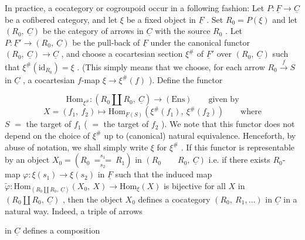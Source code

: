 In practice, a cocategory or cogroupoid occur in a following fashion: Let $P : \underline{F} \to \underline{C}$ be a cofibered category, and let $\xi$ be a fixed object in $\underline{F}$ . Set $R_0 = P(\xi)$ and let $(R_0,\ \underline{C})$ be the category of arrows in $\underline{C}$ with the source $R_0$ . Let $P : \underline{F}' \to (R_0,\ \underline{C})$ be the pull-back of $\underline{F}$ under the canonical functor $(R_0,\ \underline{C}) \to \underline{C}$ , and choose a cocartesian section $\xi^{\#}$ of $\underline{F}'$ over $(R_0,\ \underline{C})$ such that $\xi^{\#}(\mathrm{id}_{R_0}) = \xi$ . (This simply means that we choose, for each arrow $R_0 \xrightarrow{f} S$ in $\underline{C}$ , a cocartesian $f$-map $\xi \to \xi^{\#}(f)$ ). Define the functor

\begin{equation*}
\mathrm{Hom}_{\xi^{\#}} : (R_0 \amalg R_0,\ \underline{C}) \to (\mathrm{Ens}) \qquad \text{given by}
\end{equation*}
\begin{equation*}
X = (f_1,\ f_2) \longmapsto \mathrm{Hom}_{\underline{F}(S)}(\xi^{\#}(f_1),\ \xi^{\#}(f_2)) \qquad \text{where}
\end{equation*}
$S$ $=$ the target of $f_1$ ( $=$ the target of $f_2$ ). We note that this functor does not depend on the choice of $\xi^{\#}$ up to (canonical) natural equivalence. Henceforth, by abuse of notation, we shall simply write $\xi$ for $\xi^{\#}$ . If this functor is representable by an object $X_0 = (R_0 \ \overset{s_1}{\underset{s_2}{=\!=}}\ R_1)$ in $(R_0 \qquad R_0,\ \underline{C})$ i.e. if there exists $R_0$-map $\varphi : \xi(s_1) \to \xi(s_2)$ in $\underline{F}$ such that the induced map $\widetilde{\varphi} : \mathrm{Hom}_{(R_0 \amalg R_0,\ \underline{C})}(X_0,\ X) \to \mathrm{Hom}_{\xi}(X)$ is bijective for all $X$ in $(R_0 \amalg R_0,\ \underline{C})$ , then the object $X_0$ defines a cocategory $(R_0,\ R_1,\ldots)$ in $\underline{C}$ in a natural way. Indeed, a triple of arrows
in $\underline{C}$ defines a composition

